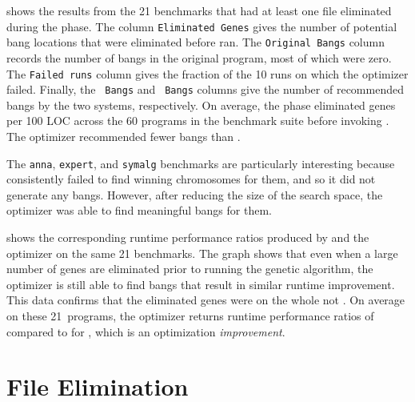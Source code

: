  shows the results from the 21 benchmarks that
had at least one file eliminated during the \preopt{} phase. The
column \texttt{Eliminated Genes} gives the number of potential bang
locations that were eliminated before \Ao{} ran.
The \texttt{Original Bangs} column records the number of bangs in the
original program, most of which were zero.
The \texttt{Failed runs} column gives the fraction of the 10 runs on
which the \Preopt{} optimizer failed.
Finally, the \texttt{\Ao{} Bangs} and \texttt{\Preopt{} Bangs} columns
give the number of recommended bangs by the two systems,
respectively.  On average, the \preopt{} phase eliminated
\preoptElim{} genes per 100 LOC across the 60 programs in the benchmark suite before
invoking \Ao{}.
The \Preopt{} optimizer recommended \preoptFewerBangs{} fewer bangs
than \Ao{}.

The \texttt{anna}, \texttt{expert}, and \texttt{symalg} benchmarks are
particularly interesting because \Ao{} consistently failed to find
winning chromosomes for them, and so it did not generate any bangs. However,
after reducing the size of the search space, the \Preopt{}
optimizer was able to find meaningful bangs for them.

 shows the corresponding runtime
performance ratios produced by \Ao{} and the \Preopt{} optimizer on
the same 21 benchmarks.
The graph shows that even when a large number of genes are
eliminated prior to running the genetic algorithm, the optimizer is still able to
find \useful{} bangs that result in similar runtime improvement. This data
confirms that the eliminated genes were on the whole not \useful{}.
On average on these 21~programs, the \Preopt{} optimizer returns
runtime performance ratios of \preoptPerformance{} compared
to \AoPerformance{} for \Ao, which is an
optimization \textit{improvement}.


\section{\Preopt{} File Elimination}

\label{sec:file-elim}

